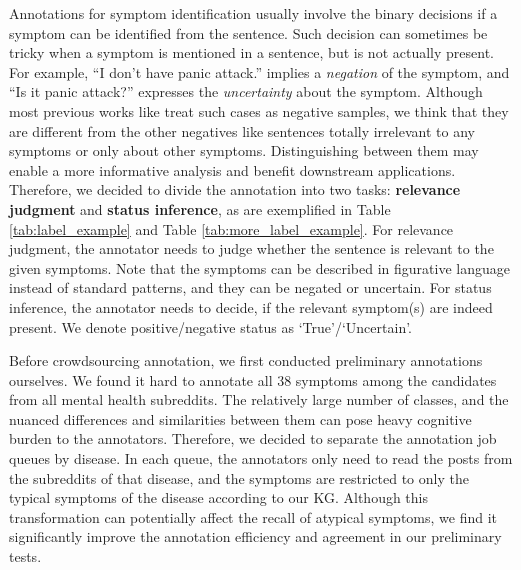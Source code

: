 Annotations for symptom identification usually involve the binary decisions if a symptom can be identified from the sentence. Such decision can sometimes be tricky when a symptom is mentioned in a sentence, but is not actually present. For example, ``I don't have panic attack.'' implies a \textit{negation} of the symptom, and ``Is it panic attack?'' expresses the \textit{uncertainty} about the symptom. Although most previous works like \citet{nguyen2022improving} treat such cases as negative samples, we think that they are different from the other negatives like sentences totally irrelevant to any symptoms or only about other symptoms. Distinguishing between them may enable a more informative analysis and benefit downstream applications. Therefore, we decided to divide the annotation into two tasks: \textbf{relevance judgment} and \textbf{status inference}, as are exemplified in Table \ref{tab:label_example} and Table \ref{tab:more_label_example}. For relevance judgment, the annotator needs to judge whether the sentence is relevant to the given symptoms. Note that the symptoms can be described in figurative language instead of standard patterns, and they can be negated or uncertain. For status inference, the annotator needs to decide, if the relevant symptom(s) are indeed present. We denote positive/negative status as `True'/`Uncertain'.

Before crowdsourcing annotation, we first conducted preliminary annotations ourselves. We found it hard to annotate all 38 symptoms among the candidates from all mental health subreddits. The relatively large number of classes, and the nuanced differences and similarities between them can pose heavy cognitive burden to the annotators. Therefore, we decided to separate the annotation job queues by disease. In each queue, the annotators only need to read the posts from the subreddits of that disease, and the symptoms are restricted to only the typical symptoms of the disease according to our KG. Although this transformation can potentially affect the recall of atypical symptoms, we find it significantly improve the annotation efficiency and agreement in our preliminary tests. 

